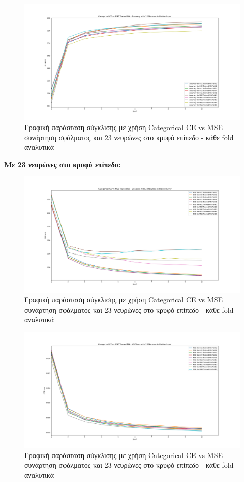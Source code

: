 \documentclass[12pt,a4paper]{article}
\begin{document}
\begin{figure}[H]
	\includegraphics[width=\textwidth]{Screenshots/6. CCE vs MSE - Accuracy - 12 Neurons.png}
	\caption{Γραφική παράσταση σύγκλισης με χρήση Categorical CE vs MSE συνάρτηση σφάλματος και 23 νευρώνες στο κρυφό επίπεδο - κάθε fold αναλυτικά}
\end{figure}

\textbf{Με 23 νευρώνες στο κρυφό επίπεδο:}

\begin{figure}[H]
	\includegraphics[width=\textwidth]{Screenshots/7. CCE vs MSE - CCE Loss - 23 Neurons.png}
	\caption{Γραφική παράσταση σύγκλισης με χρήση Categorical CE vs MSE συνάρτηση σφάλματος και 23 νευρώνες στο κρυφό επίπεδο - κάθε fold αναλυτικά}
\end{figure}

\begin{figure}[H]
	\includegraphics[width=\textwidth]{Screenshots/8. CCE vs MSE - MSE Loss - 23 Neurons.png}
	\caption{Γραφική παράσταση σύγκλισης με χρήση Categorical CE vs MSE συνάρτηση σφάλματος και 23 νευρώνες στο κρυφό επίπεδο - κάθε fold αναλυτικά}
\end{figure}
\end{document}
